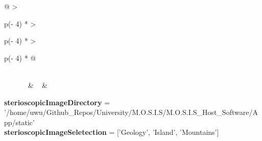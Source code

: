 \begin{longtable}[]{@{}
  >{\raggedright\arraybackslash}p{(\columnwidth - 4\tabcolsep) * }
  >{\raggedright\arraybackslash}p{(\columnwidth - 4\tabcolsep) * }
  >{\raggedright\arraybackslash}p{(\columnwidth - 4\tabcolsep) * }@{}}
\toprule
\endhead
{} \\
{~~~~~~} & ~ & \begin{minipage}[t]{\linewidth}\raggedright
\textbf{sterioscopicImageDirectory} =
'/home/uwu/Github\_Repos/University/M.O.S.I.S/M.O.S.I.S\_Host\_Software/App/static'\\
\textbf{sterioscopicImageSeletection} = {[}'Geology', 'Island',
'Mountains'{]}\strut
\end{minipage} \\
\bottomrule
\end{longtable}
